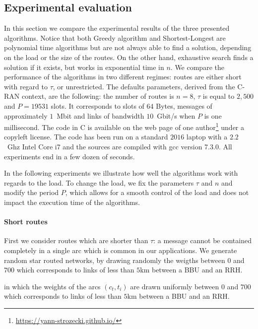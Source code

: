 \documentclass[a4paper,10pt]{article}
\begin{document}
   \subsection{Experimental evaluation}\label{sec:exp_PAZL}
   
   In this section we compare the experimental results of the three presented algorithms.
      Notice that both Greedy algorithm and Shortest-Longest are polynomial time algorithms but are not always able to find a solution, depending on the load or the size of the routes. On the other hand, exhaustive search finds a solution if it exists, but works in exponential time in $n$. We compare the performance of the algorithms in two different regimes: routes are either short with regard to $\tau$, or unrestricted.
      The defaults parameters, derived from the C-RAN context, are the following: the number of routes is $n = 8$, $\tau$ is equal to $2,500$ and $P=19531$ slots. It corresponds to slots of $64$ Bytes, messages of approximately $1$~Mbit and links of bandwidth $10$~Gbit/s when $P$ is one millisecond. 
       The code in C is available on the web page of one author\footnote{\url{https://yann-strozecki.github.io/}} under a copyleft license. The code has been run on a standard $2016$ laptop with a $2.2$~Ghz Intel Core i7 and the sources are compiled with gcc version 7.3.0. All experiments end in a few dozen of seconds.

       In the following experiments we illustrate how well the algorithms work with regards to the load. To change the load, we fix the parameters $\tau$ and $n$ and modify the period $P$, which allows for a smooth control of the load and does not impact the execution time of the algorithms.
      

      \paragraph{Short routes}
      
      First we consider routes which are shorter than $\tau$: a message cannot be contained completely in a single arc which is common in our applications. We generate random star routed networks, by drawing randomly the weigths between $0$ and $700$ which corresponds to links of less than $5$km between a BBU and an RRH.

       in which the weights of the arcs $(c_t,t_i)$ are drawn uniformly between $0$ and $700$ which corresponds to links of less than $5$km between a BBU and an RRH. 
      
\end{document}
